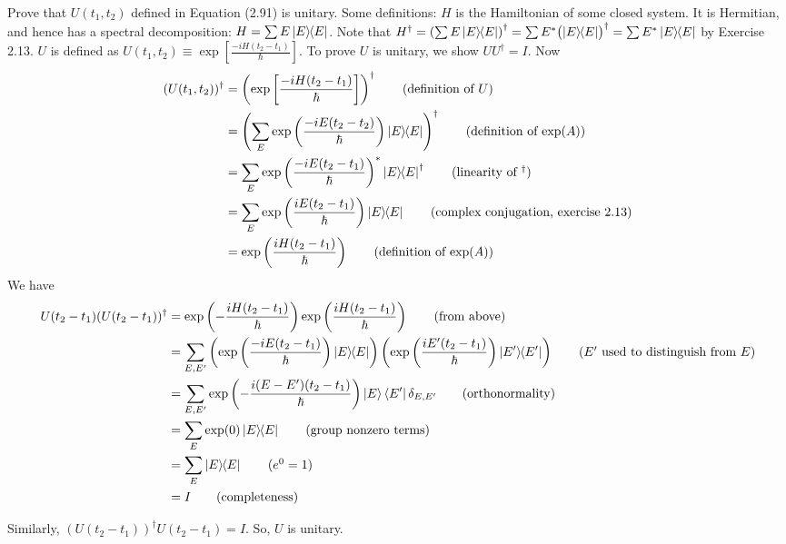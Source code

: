  Prove that $U(t_1,t_2)$ defined in Equation (2.91) is unitary.
\Soln Some definitions: $H$ is the Hamiltonian of some closed system.  It is Hermitian, and hence has a spectral decomposition: $H = \sum  E \ket{E}\hspace{-1mm} \bra{E}$.  Note that $H^\dagger=\left(\sum E \ket{E}\hspace{-1mm} \bra{E}\right)^\dagger = \sum E^* \bigl(\ket{E}\hspace{-1mm} \bra{E}\bigr)^\dagger = \sum E^* \ket{E}\hspace{-1mm} \bra{E}$ by Exercise 2.13.  $U$ is defined as $U(t_1, t_2) \equiv \exp\left[\frac{-iH(t_2-t_1)}{\hbar}\right]$.  To prove $U$ is unitary, we show $UU^\dagger=I$.  Now
\begin{align*}
 (U(t_1,t_2))^\dagger &= \left(\exp\left[\frac{-iH(t_2-t_1)}{\hbar}\right]\right)^\dagger \tag{definition of $U$}\\
    &= \left(\sum_E \exp\left(\frac{-iE(t_2-t_2)}{\hbar}\right)\ket{E}\hspace{-1mm} \bra{E}\right)^\dagger \tag{definition of $\exp(A)$}\\
    &= \sum_E \exp\left(\frac{-iE(t_2-t_1)}{\hbar}\right)^*\ket{E}\hspace{-1mm} \bra{E}^\dagger \tag{linearity of $^\dagger$} \\
    &= \sum_E \exp \left(\frac{iE(t_2-t_1)}{\hbar}\right)\ket{E}\hspace{-1mm} \bra{E} \tag{complex conjugation, exercise 2.13} \\
    &= \exp\left(\frac{iH(t_2-t_1)}{\hbar}\right) \tag{definition of $\exp(A)$}
    \end{align*}
We have   
\begin{align*}
	U(t_2 - t_1) (U(t_2 - t_1))^\dagger &= \exp \left( - \frac{iH(t_2 - t_1)}{\hbar} \right)  \exp \left(  \frac{iH(t_2 - t_1)}{\hbar} \right) \tag{from above}\\
		&= \sum_{E, E'} \left(\exp \left(\frac{-iE(t_2 - t_1)}{\hbar} \right) \ket{E}\hspace{-1mm} \bra{E} \right)
										\left(\exp \left(\frac{iE'(t_2 - t_1)}{\hbar} \right) \ket{E'}\hspace{-1mm} \bra{E'} \right) \tag{$E'$ used to distinguish from $E$}\\
		&= \sum_{E, E'} \exp \left(- \frac{i(E-E')(t_2 - t_1)}{\hbar} \right) \ket{E}\bra{E'} \delta_{E,E'} \tag{orthonormality}\\
		&= \sum_E \exp(0) \ket{E}\hspace{-1mm} \bra{E} \tag{group nonzero terms}\\
		&= \sum_E \ket{E}\hspace{-1mm} \bra{E} \tag{$e^0=1$}\\
		&= I \tag{completeness}
\end{align*}

Similarly, $(U(t_2 - t_1))^\dagger U (t_2 - t_1) = I$.  So, $U$ is unitary.

